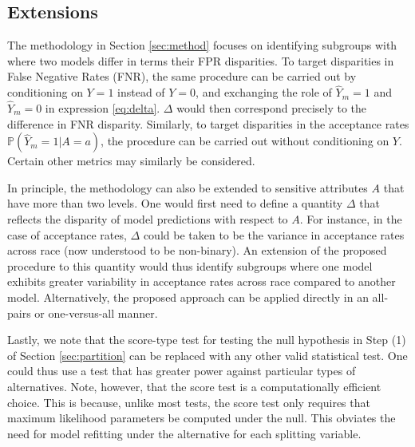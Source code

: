 \documentclass[11pt, sigconf, svgnames]{acmart}
\newcommand{\maxtxt}[1]{\textcolor{blue}{#1}}
\renewcommand{\P}{\mathbb{P}}
\begin{document}
 \subsection{Extensions}\label{sec:extensions}
 
 

 The methodology in Section \ref{sec:method} focuses on identifying subgroups
 with where two models differ in terms their FPR disparities.  To target disparities in False Negative Rates (FNR), the same procedure can be
 carried out by conditioning on $Y=1$ instead of $Y=0$, and exchanging the role of
 $\hat{Y}_m=1$ and $\hat{Y}_m=0$ in expression \eqref{eq:delta}.   $\Delta$ would then correspond precisely to the difference in FNR disparity. Similarly, to target disparities in the acceptance rates $\P(\hat{Y}_m = 1| A=a)$,
 the procedure can be carried out without conditioning
 on $Y$.   Certain other metrics may similarly be considered.  

 In principle, the methodology can also be extended to sensitive attributes $A$ that have more than two levels.  One would first need to define a quantity $\Delta$ that reflects the disparity of model predictions with respect to $A$.  For instance, in the case of acceptance rates, $\Delta$ could be taken to be the variance in acceptance rates across race (now understood to be non-binary).  An extension of the proposed procedure to this quantity would thus identify subgroups where one model exhibits greater variability in acceptance rates across race compared to another model.   Alternatively, the proposed approach can be applied directly in an all-pairs or one-versus-all manner.
 
Lastly, we note that the score-type test for testing the null hypothesis in Step (1) of Section \ref{sec:partition} can be replaced with any other valid statistical test.  One could thus use a test that has greater power against particular types of alternatives.  Note, however, that the score test is a computationally efficient choice.   This is because, unlike most tests, the score test only requires that maximum likelihood parameters be computed under the null.  This obviates the need for model refitting under the alternative for each splitting variable.

%
\end{document}
